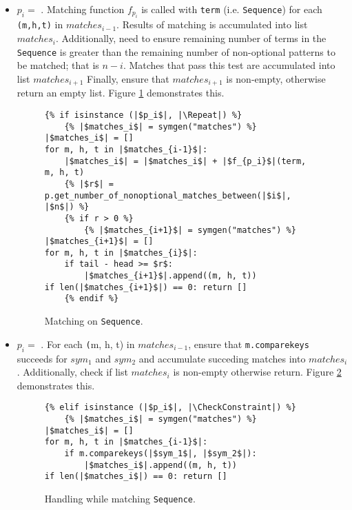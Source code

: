 \begin{itemize}
\item $p_i=$ \PatternRepeat. Matching function $f_{p_i}$ is called with \texttt{term} (i.e. \texttt{Sequence}) for each \texttt{(m,h,t)} in $matches_{i-1}$. Results of matching is accumulated into list $matches_{i}$. Additionally, need to ensure remaining number of terms in the \texttt{Sequence} is greater than the remaining number of non-optional patterns to be matched; that is $n-i$. Matches that pass this test are accumulated into list $matches_{i+1}$ Finally, ensure that $matches_{i+1}$ is non-empty, otherwise return an empty list. Figure \ref{codegen-pattern-seq-2} demonstrates this.

\begin{figure}[htb]
\centering
\begin{verbatim}
{% if isinstance (|$p_i$|, |\Repeat|) %}
	{% |$matches_i$| = symgen("matches") %}
|$matches_i$| = []
for m, h, t in |$matches_{i-1}$|:
	|$matches_i$| = |$matches_i$| + |$f_{p_i}$|(term, m, h, t)
	{% |$r$| = p.get_number_of_nonoptional_matches_between(|$i$|, |$n$|) %}
	{% if r > 0 %}
		{% |$matches_{i+1}$| = symgen("matches") %}
|$matches_{i+1}$| = []
for m, h, t in |$matches_{i}$|:
	if tail - head >= $r$:
		|$matches_{i+1}$|.append((m, h, t))
if len(|$matches_{i+1}$|) == 0: return []
	{% endif %}
\end{verbatim}
\caption{Matching \RepeatNoArg \space on \texttt{Sequence}.}
\label{codegen-pattern-seq-2}
\end{figure}

\item $p_i=$ \PatternCheckConstraint. For each \texttt(m, h, t) in $matches_{i-1}$, ensure that \texttt{m.comparekeys} succeeds for $sym_1$ and $sym_2$ and accumulate succeding matches into $matches_{i}$. Additionally, check if list $matches_{i}$ is non-empty otherwise return. Figure \ref{codegen-pattern-seq-3} demonstrates this.


\begin{figure}[htb]
\centering
\begin{verbatim}
{% elif isinstance (|$p_i$|, |\CheckConstraint|) %}
	{% |$matches_i$| = symgen("matches") %}
|$matches_i$| = []
for m, h, t in |$matches_{i-1}$|:
	if m.comparekeys(|$sym_1$|, |$sym_2$|):
		|$matches_i$|.append((m, h, t))
if len(|$matches_i$|) == 0: return []
\end{verbatim}
\caption{Handling \ConstraintCheckNoArg \space while matching \texttt{Sequence}.}
\label{codegen-pattern-seq-3}
\end{figure}


\end{itemize}
